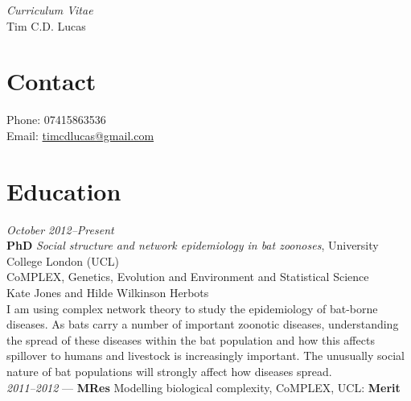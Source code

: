 \documentclass[a4paper,10pt,reqno,oneside]{amsart}
\begin{document}
\title{}
\author{}
\date{}

\maketitle

\thispagestyle{plain}

\begin{flushleft}
\vspace{-2.2cm}
\Large{\emph{Curriculum Vitae}}\\
\fontsize{6mm}{1cm}
\selectfont
\Huge{\textsf{Tim C.D. Lucas}}
\end{flushleft}
\normalfont

\section*{Contact}



Phone: 07415863536\\
Email: \href{mailto:timcdlucas@gmail.com}{timcdlucas@gmail.com}\\


 
\vspace{7mm}
\section*{Education}

\emph{October 2012--Present} \\
\textbf{PhD} \emph{Social structure and network epidemiology in bat zoonoses}, University College London \small{(UCL)}\\


\small{CoMPLEX}, Genetics, Evolution and Environment and Statistical Science\\
Kate Jones and Hilde Wilkinson Herbots\\

I am using complex network theory to study the epidemiology of bat-borne diseases. As bats carry a number of important zoonotic diseases, understanding the spread of these diseases within the bat population and how this affects spillover to humans and livestock is increasingly important. The unusually social nature of bat populations will strongly affect how diseases spread.\\
 

\emph{2011--2012} --- \textbf{MRes} Modelling biological complexity, \small{CoMPLEX, UCL}: \textbf{Merit}\\
\end{document}
